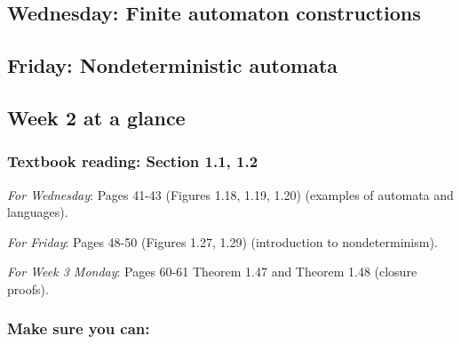 \subsection*{Wednesday: Finite automaton constructions}




\newpage
\subsection*{Friday: Nondeterministic automata}





\newpage
\subsection*{Week 2 at a glance}

\subsubsection*{Textbook reading: Section 1.1, 1.2}

{\it For Wednesday}: Pages 41-43 (Figures 1.18, 1.19, 1.20) (examples of automata and languages).

{\it For Friday}: Pages 48-50 (Figures 1.27, 1.29) (introduction to nondeterminism).

{\it For Week 3 Monday}: Pages 60-61 Theorem 1.47 and Theorem 1.48 (closure proofs).


\subsubsection*{Make sure you can:}


